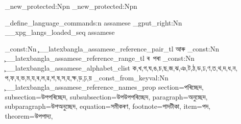 {    \cs_new_protected:Npn \captionsassamese
      {
        \def\prefacename{পাতনি}
        \def\refname{প্ৰসংগ}
        \def\abstractname{মূলভাৱ}
        \def\bibname{তথ্যসূত্ৰ}
        \def\chaptername{অধ্যায়}
        \def\appendixname{পৰিশিষ্ট}
        \def\contentsname{সমল}
        \def\listfigurename{চিত্ৰসূচী}
        \def\listtablename{সাৰণীসূচী}
        \def\indexname{বিষয়সূচী}
        \def\figurename{চিত্ৰ}
        \def\tablename{সাৰণী}
        \def\partname{অংশ}
        \def\pagename{পৃষ্ঠা}
        \def\seename{চাওক}
        \def\alsoname{আৰু~চাওক}
        \def\enclname{সংযোজিত}
        \def\ccname{প্ৰতিলিপি}
        \def\headtoname{প্ৰতি}
        \def\proofname{প্ৰমাণ}
        \def\glossaryname{অৰ্থকোষ}
      }
    \cs_new_protected:Npn \dateassamese
      {
        \def\today{\assamesenumber\day\space
          \ifcase\month\or জানুৱাৰী\or ফেব্ৰুৱাৰী\or মাৰ্চ\or এপ্ৰিল\or
          মে’\or জুন\or জুলাই\or আগষ্ট\or ছেপ্তেম্বৰ\or অক্টোবৰ\or
          নৱেম্বৰ\or ডিচেম্বৰ\fi,~\assamesenumber\year}
      }

    \xpg_define_language_commands:n {assamese}
    \seq_gput_right:Nn \g__xpg_langs_loaded_seq {assamese}
  }

\tl_const:Nn \c__latexbangla_assamese_reference_pair_tl {আৰু}
\tl_const:Nn \c__latexbangla_assamese_reference_range_tl {ৰ~পৰা\nobreakspace}
\clist_const:Nn \c__latexbangla_assamese_alphabet_clist
  {ক,খ,গ,ঘ,ঙ,চ,ছ,জ,ঝ,ঞ,ট,ঠ,ড,ঢ,ণ,ত,থ,দ,ধ,ন,
   প,ফ,ব,ভ,ম,য,ৰ,ল,ৱ,শ,ষ,স,হ,ক্ষ,ড়,ঢ়,য়}
\prop_const_from_keyval:Nn \c__latexbangla_assamese_reference_names_prop
  {
    section=পৰিচ্ছেদ,
    subsection=উপপৰিচ্ছেদ,
    subsubsection=উপউপপৰিচ্ছেদ,
    paragraph=অনুচ্ছেদ,
    subparagraph=উপঅনুচ্ছেদ,
    equation=সমীকৰণ,
    footnote=পাদটীকা,
    item=পদ,
    theorem=উপপাদ্য,
  }
\endinput
